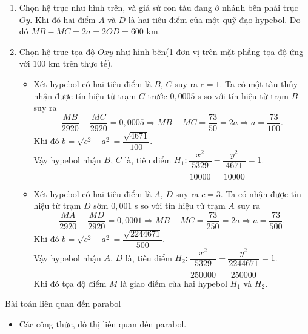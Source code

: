 \begin{bt}
{\begin{enumerate}
	\item Chọn hệ trục như hình trên, và giả sử con tàu đang ở nhánh bên phải trục $Oy$.	Khi đó hai điểm $A$ và $D$ là hai tiêu điểm của một quỹ đạo hypebol. Do đó $MB-MC=2a=2OD=600$ km.
	\item Chọn hệ trục tọa độ $Oxy$ như hình bên(1 đơn vị trên mặt phẳng tọa độ ứng với $100$ km trên thực tế). 
	\begin{itemize}
		\item Xét hypebol có hai tiêu điểm là $B$, $C$ suy ra $c=1$. Ta có một tàu thủy nhận được tín hiệu từ trạm $C$ trước $0{,}0005$ s so với tín hiệu từ trạm $B$ suy ra
		\[\dfrac{MB}{2920}-\dfrac{MC}{2920}=0{,}0005\Rightarrow MB-MC= \dfrac{73}{50}=2a\Rightarrow a=\dfrac{73}{100}.\]
		Khi đó $b=\sqrt{c^2-a^2}=\dfrac{\sqrt{4671}}{100}$.\\
		Vậy hypebol nhận $B$, $C$ là, tiêu điểm $H_1\colon \dfrac{x^2}{\dfrac{5329}{10000}}-\dfrac{y^2}{\dfrac{4671}{10000}}=1$.
		\item Xét hypebol có hai tiêu điểm là $A$, $D$ suy ra $c=3$. Ta có  nhận được tín hiệu từ trạm $D$ sớm $0{,} 001$ s so với tín hiệu từ trạm $A$ suy ra
		\[\dfrac{MA}{2920}-\dfrac{MD}{2920}=0{,}0001\Rightarrow MB-MC= \dfrac{73}{250}=2a\Rightarrow a=\dfrac{73}{500}.\]
		Khi đó $b=\sqrt{c^2-a^2}=\dfrac{\sqrt{2244671}}{500}$.\\
		Vậy hypebol nhận $A$, $D$ là, tiêu điểm $H_2\colon \dfrac{x^2}{\dfrac{5329}{250000}}-\dfrac{y^2}{\dfrac{2244671}{250000}}=1$.\\
		Khi đó tọa độ điểm $M$ là giao điểm của hai hypebol $H_1$ và $H_2$.
	\end{itemize}
\end{enumerate} 
	
	}
\end{bt}

\begin{dang}{Bài toán liên quan đến parabol}
	\begin{itemize}
		\item Các công thức, đồ thị liên quan đến parabol.
	\end{itemize}
\end{dang}

